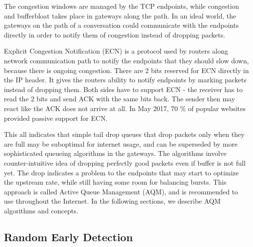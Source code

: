The congestion windows are managed by the TCP endpoints, while congestion and bufferbloat takes place in gateways along the path. In an ideal world, the gateways on the path of a conversation could communicate with the endpoints directly in order to notify them of congestion instead of dropping packets.

Explicit Congestion Notification (ECN) \cite{rfc3168:ECN} is a protocol used by routers along network communication path to notify the endpoints that they should slow down, because there is ongoing congestion. There are 2 bits reserved for ECN directly in the IP header. It gives the routers ability to notify endpoints by marking packets instead of dropping them. Both sides have to support ECN - the receiver has to read the 2 bits and send ACK with the same bits back. The sender then may react like the ACK does not arrive at all. In May 2017, 70 \% of popular websites provided passive support for ECN\cite{ECN:proceedings}.

This all indicates that simple tail drop queues that drop packets only when they are full may be suboptimal for internet usage, and can be superseded by more sophisticated queueing algorithms in the gateways. The algorithms involve counter-intuitive idea of dropping perfectly good packets even if buffer is not full yet. The drop indicates a problem to the endpoints that may start to optimize the upstream rate, while still having some room for balancing bursts. This approach is called Active Queue Management (AQM), and is recommended to use throughout the Internet. In the following sections, we describe AQM algorithms and concepts.

\subsection{Random Early Detection}

